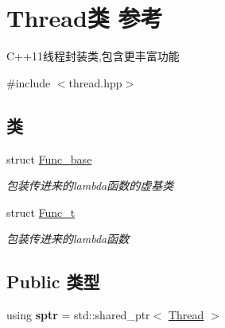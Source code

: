 \hypertarget{classThread}{}\section{Thread类 参考}
\label{classThread}


C++11线程封装类,包含更丰富功能  




{\ttfamily \#include $<$thread.\+hpp$>$}

\subsection*{类}
\begin{DoxyCompactItemize}
\item 
struct \hyperlink{structThread_1_1Func__base}{Func\+\_\+base}
\begin{DoxyCompactList}\small\item\em 包装传进来的lambda函数的虚基类 \end{DoxyCompactList}\item 
struct \hyperlink{structThread_1_1Func__t}{Func\+\_\+t}
\begin{DoxyCompactList}\small\item\em 包装传进来的lambda函数 \end{DoxyCompactList}\end{DoxyCompactItemize}
\subsection*{Public 类型}
\begin{DoxyCompactItemize}
\item 
\mbox{\label{classThread_a430059e402325caaf1ed185fb520c9d2}} 
using {\bfseries sptr} = std\+::shared\+\_\+ptr$<$ \hyperlink{classThread}{Thread} $>$
\end{DoxyCompactItemize}
